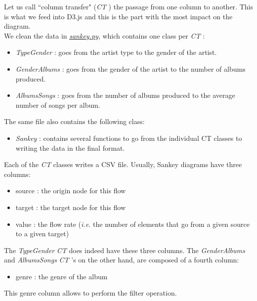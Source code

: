 \documentclass{article}
\newcommand{\ie}{\textit{i.e. }}
\newcommand{\tg}{\textit{TypeGender }}
\newcommand{\ga}{\textit{GenderAlbums }}
\newcommand{\as}{\textit{AlbumsSongs }}
\newcommand{\sk}{\textit{Sankey }}
\newcommand{\ct}{\textit{CT }}
\begin{document}
Let us call ``column transfer" (\ct) the passage from one column to another. This is what we feed into D3.js and this is the part with the most impact on the diagram. \\
We clean the data in \href{https://github.com/jorislimonier/collab-viz/blob/main/joris/src/sankey.py}{\textit{sankey.py}}, which contains one class per \ct:
\begin{itemize}
    \item \tg : goes from the artist type to the gender of the artist.
    \item \ga : goes from the gender of the artist to the number of albums produced.
    \item \as : goes from the number of albums produced to the average number of songs per album.
\end{itemize}
The same file also contains the following class:
\begin{itemize}
    \item \sk : contains several functions to go from the individual CT classes to writing the data in the final format.
\end{itemize}

Each of the \ct classes writes a CSV file. Usually, Sankey diagrams have three columns:
\begin{itemize}
    \item source : the origin node for this flow
    \item target : the target node for this flow
    \item value : the flow rate (\ie the number of elements that go from a given source to a given target)
\end{itemize}
The \tg \ct does indeed have these three columns. The \ga and \as \ct's on the other hand, are composed of a fourth column:
\begin{itemize}
    \item genre : the genre of the album
\end{itemize}
This genre column allows to perform the filter operation.
\end{document}
